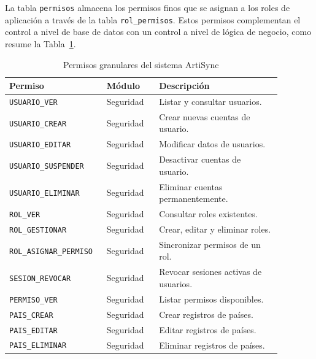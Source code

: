 \documentclass[conference, onecolumn]{IEEEtran}
\begin{document}
La tabla \texttt{permisos} almacena los permisos finos que se asignan a los roles de aplicación a través de la tabla \texttt{rol\_permisos}. Estos permisos complementan el control a nivel de base de datos con un control a nivel de lógica de negocio, como resume la Tabla~\ref{tab:permisos_app}.

\begin{table}[H]
\centering
\caption{Permisos granulares del sistema ArtiSync}
\label{tab:permisos_app}
\scriptsize
\begin{tabular}{>{\raggedright\arraybackslash}p{0.28\linewidth} >{\raggedright\arraybackslash}p{0.18\linewidth} >{\raggedright\arraybackslash}p{0.42\linewidth}}
\toprule
\textbf{Permiso} & \textbf{Módulo} & \textbf{Descripción} \\
\midrule
\texttt{USUARIO\_VER} & Seguridad & Listar y consultar usuarios. \\
\texttt{USUARIO\_CREAR} & Seguridad & Crear nuevas cuentas de usuario. \\
\texttt{USUARIO\_EDITAR} & Seguridad & Modificar datos de usuarios. \\
\texttt{USUARIO\_SUSPENDER} & Seguridad & Desactivar cuentas de usuario. \\
\texttt{USUARIO\_ELIMINAR} & Seguridad & Eliminar cuentas permanentemente. \\
\texttt{ROL\_VER} & Seguridad & Consultar roles existentes. \\
\texttt{ROL\_GESTIONAR} & Seguridad & Crear, editar y eliminar roles. \\
\texttt{ROL\_ASIGNAR\_PERMISO} & Seguridad & Sincronizar permisos de un rol. \\
\texttt{SESION\_REVOCAR} & Seguridad & Revocar sesiones activas de usuarios. \\
\texttt{PERMISO\_VER} & Seguridad & Listar permisos disponibles. \\
\texttt{PAIS\_CREAR} & Seguridad & Crear registros de países. \\
\texttt{PAIS\_EDITAR} & Seguridad & Editar registros de países. \\
\texttt{PAIS\_ELIMINAR} & Seguridad & Eliminar registros de países. \\
\bottomrule
\end{tabular}
\end{table}

\end{document}

